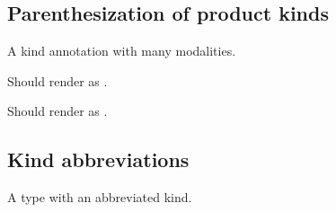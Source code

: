 \subsection{Parenthesization of product kinds\label{Oxcaml--parenthesization-of-product-kinds}}%
\label{Oxcaml--type-t_many_modalities}\begin{ocamlindent}A  kind annotation with many modalities.\end{ocamlindent}%
\medbreak
\label{Oxcaml--type-t_outer_mod}\begin{ocamlindent}Should render as .\end{ocamlindent}%
\medbreak
\label{Oxcaml--type-t_inner_mod}\begin{ocamlindent}Should render as .\end{ocamlindent}%
\medbreak
\subsection{Kind abbreviations\label{Oxcaml--kind-abbreviations_2}}%
\label{Oxcaml--type-t_abbrev}\begin{ocamlindent}A type with an abbreviated kind.\end{ocamlindent}%
\medbreak
